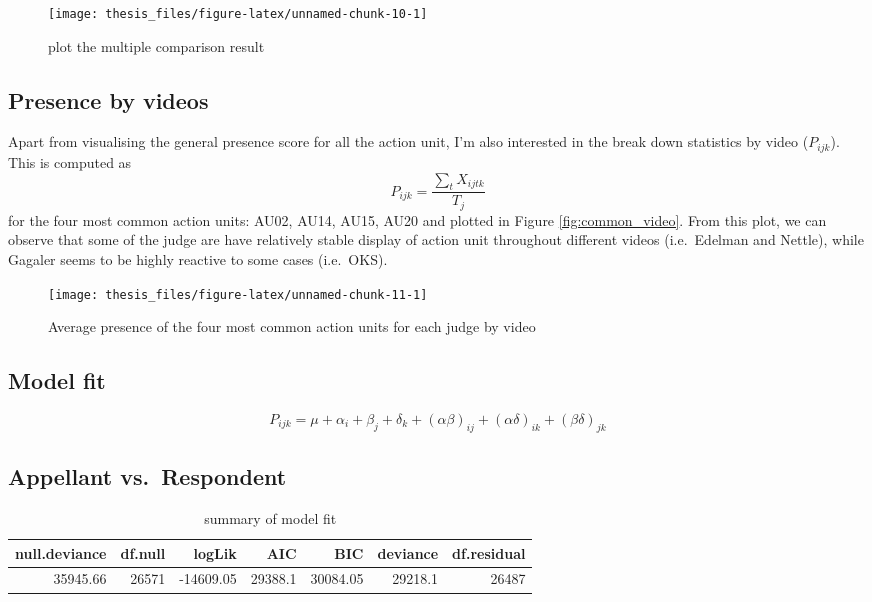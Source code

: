 \documentclass{monashthesis}
\begin{document}
\begin{figure}
\texttt{[image: thesis\_files/figure-latex/unnamed-chunk-10-1]} \caption{plot the multiple comparison result \label{fig:result_1}}\label{fig:unnamed-chunk-10}
\end{figure}

\hypertarget{presence-by-videos}{%
\subsection{Presence by videos}\label{presence-by-videos}}

Apart from visualising the general presence score for all the action unit, I'm also interested in the break down statistics by video (\(P_{ijk}\)). This is computed as \[P_{ijk} = \frac{\sum_{t}X_{ijtk}}{T_j}\] for the four most common action units: AU02, AU14, AU15, AU20 and plotted in Figure \ref{fig:common_video}. From this plot, we can observe that some of the judge are have relatively stable display of action unit throughout different videos (i.e.~Edelman and Nettle), while Gagaler seems to be highly reactive to some cases (i.e.~OKS).

\begin{figure}
\texttt{[image: thesis\_files/figure-latex/unnamed-chunk-11-1]} \caption{Average presence of the four most common action units for each judge by video\label{fig:common_video}}\label{fig:unnamed-chunk-11}
\end{figure}

\hypertarget{model-fit-1}{%
\subsection{Model fit}\label{model-fit-1}}

\begin{equation}\label{eq:judge_au_video}
P_{ijk} = \mu + \alpha_i + \beta_j +\delta_k + (\alpha\beta)_{ij}+(\alpha\delta)_{ik} + (\beta\delta)_{jk}
\end{equation}

\hypertarget{appellant-vs.respondent}{%
\subsection{Appellant vs.~Respondent}\label{appellant-vs.respondent}}

\begin{table}[t]

\caption{\label{tab:unnamed-chunk-15}\label{tab:glance_3}summary of model fit}
\centering
\begin{tabular}{r|r|r|r|r|r|r}
\hline
null.deviance & df.null & logLik & AIC & BIC & deviance & df.residual\\
\hline
35945.66 & 26571 & -14609.05 & 29388.1 & 30084.05 & 29218.1 & 26487\\
\hline
\end{tabular}
\end{table}
\end{document}
